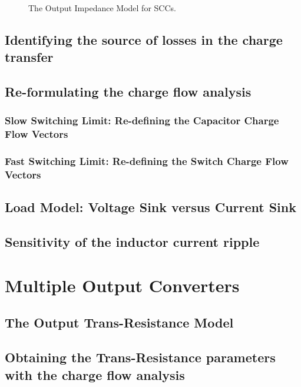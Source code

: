 \begin{figure}[!h]
\centering
%
\label{fig:SINE}
\caption{The Output Impedance Model for SCCs. }
\end{figure}






\subsection{Identifying the source of losses in the charge transfer}
\subsection{Re-formulating the charge flow analysis}
\subsubsection[SSL Capacitor Charge Flow]{Slow Switching Limit: Re-defining the Capacitor Charge Flow Vectors}
\subsubsection[FSL Switch Charge Flow]{Fast Switching Limit: Re-defining the Switch Charge Flow Vectors}

\subsection{Load Model: Voltage Sink versus Current Sink}
\subsection{Sensitivity of the inductor current ripple}

\section{Multiple Output Converters}
\subsection{The Output Trans-Resistance Model}
\subsection{Obtaining the Trans-Resistance parameters with the charge flow analysis }













